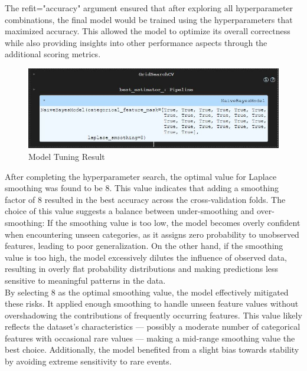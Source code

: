 The refit="accuracy" argument ensured that after exploring all hyperparameter combinations, the final model would be trained using the hyperparameters that maximized accuracy. This allowed the model to optimize its overall correctness while also providing insights into other performance aspects through the additional scoring metrics.\\

\begin{figure}[hbt!]
    \centering
    \includegraphics[width=1\linewidth]{Images/6.6a.jpg}
    \caption{Model Tuning Result}
    \label{fig:enter-label}
\end{figure}

After completing the hyperparameter search, the optimal value for Laplace smoothing was found to be 8. This value indicates that adding a smoothing factor of 8 resulted in the best accuracy across the cross-validation folds. The choice of this value suggests a balance between under-smoothing and over-smoothing: If the smoothing value is too low, the model becomes overly confident when encountering unseen categories, as it assigns zero probability to unobserved features, leading to poor generalization. On the other hand, if the smoothing value is too high, the model excessively dilutes the influence of observed data, resulting in overly flat probability distributions and making predictions less sensitive to meaningful patterns in the data.\\

By selecting 8 as the optimal smoothing value, the model effectively mitigated these risks. It applied enough smoothing to handle unseen feature values without overshadowing the contributions of frequently occurring features. This value likely reflects the dataset’s characteristics — possibly a moderate number of categorical features with occasional rare values — making a mid-range smoothing value the best choice. Additionally, the model benefited from a slight bias towards stability by avoiding extreme sensitivity to rare events.\\

